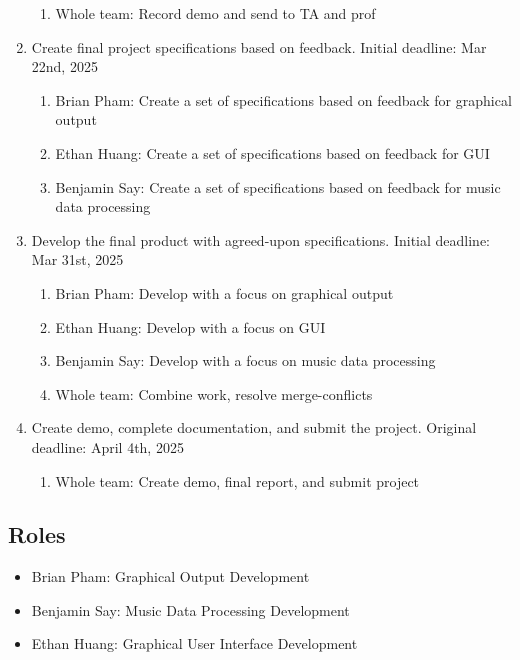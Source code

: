 \documentclass{article}
\begin{document}
\begin{enumerate}
    \begin{enumerate}
        \item Whole team: Record demo and send to TA and prof \end{enumerate}
    \item Create final project specifications based on feedback. Initial deadline: Mar 22nd, 2025
    \begin{enumerate}
        \item Brian Pham: Create a set of specifications based on feedback for graphical output
        \item Ethan Huang: Create a set of specifications based on feedback for GUI
        \item Benjamin Say: Create a set of specifications based on feedback for music data processing \end{enumerate}
    \item Develop the final product with agreed-upon specifications. Initial deadline: Mar 31st, 2025
    \begin{enumerate}
        \item Brian Pham: Develop with a focus on graphical output
        \item Ethan Huang: Develop with a focus on GUI
        \item Benjamin Say: Develop with a focus on music data processing 
        \item Whole team: Combine work, resolve merge-conflicts\end{enumerate}
    \item Create demo, complete documentation, and submit the project. Original deadline: April 4th, 2025
    \begin{enumerate}
        \item Whole team: Create demo, final report, and submit project \end{enumerate}
\end{enumerate}


\subsection{Roles}

\begin{itemize}
    \item Brian Pham: Graphical Output Development
    \item Benjamin Say: Music Data Processing Development
    \item Ethan Huang: Graphical User Interface Development
\end{itemize}
\end{document}
